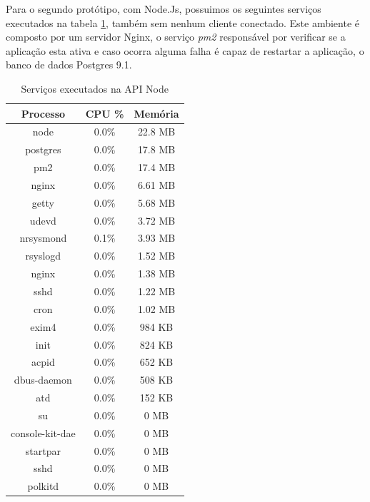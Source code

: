   \vspace{-1.9cm}

  Para o segundo protótipo, com Node.Js, possuimos os seguintes serviços executados na tabela \ref{tab:services-in-api-node}, 
  também sem nenhum cliente conectado. Este ambiente é composto por um servidor Nginx, o serviço \textit{pm2} responsável por
  verificar se a aplicação esta ativa e caso ocorra alguma falha é capaz de restartar a aplicação, 
  o banco de dados Postgres 9.1.
  
   \begin{table}[H]
    \centering
    \footnotesize
    \setlength{\abovecaptionskip}{0pt}
    \setlength{\belowcaptionskip}{0pt}
    \caption[Serviços executados na API Node]{Serviços executados na API Node}
    \label{tab:services-in-api-node}
    \begin{tabular}{c|c|c}
      \hline \hline
      Processo  & 	CPU \% &	Memória \\
      \hline \hline
      node &		0.0\% &		22.8 MB \\
      postgres &	0.0\% &		17.8 MB \\
      pm2 &		0.0\% &		17.4 MB \\
      nginx &		0.0\% &		6.61 MB \\
      getty &		0.0\% &		5.68 MB \\
      udevd &		0.0\% &		3.72 MB \\
      nrsysmond &	0.1\% &		3.93 MB \\
      rsyslogd &	0.0\% &		1.52 MB \\
      nginx &		0.0\% &		1.38 MB \\
      sshd &		0.0\% &		1.22 MB \\
      cron &		0.0\% &		1.02 MB \\
      exim4 &		0.0\% &		984 KB \\
      init &		0.0\% &		824 KB \\
      acpid &		0.0\% &		652 KB \\
      dbus-daemon &	0.0\% &		508 KB \\
      atd &		0.0\% &		152 KB \\
      su &		0.0\% &		0 MB \\
      console-kit-dae &	0.0\% &		0 MB \\
      startpar & 	0.0\% &		0 MB \\
      sshd &		0.0\% &		0 MB \\
      polkitd &		0.0\% &		0 MB \\
      \hline \hline
    \end{tabular}
  \end{table}
   
